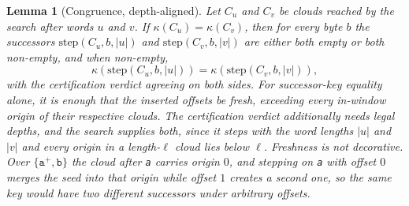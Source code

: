 \documentclass[11pt,a4paper]{article}
\theoremstyle{definition}
\theoremstyle{plain}
\newtheorem{lemma}{Lemma}
\newcommand{\code}[1]{\texttt{#1}}
\begin{document}
\begin{lemma}[Congruence, depth-aligned] \label{lem:congruence} Let $C_u$ and $C_v$ be clouds reached by the search
after words $u$ and $v$. If $\kappa(C_u) = \kappa(C_v)$, then for every byte $b$ the successors
$\mathrm{step}(C_u, b, |u|)$ and $\mathrm{step}(C_v, b, |v|)$ are either both empty or both non-empty, and when
non-empty, \[ \kappa(\mathrm{step}(C_u, b, |u|)) = \kappa(\mathrm{step}(C_v, b, |v|)), \] with the certification verdict
agreeing on both sides. For successor-key equality alone, it is enough that the inserted offsets be \emph{fresh},
exceeding every in-window origin of their respective clouds. The certification verdict additionally needs legal depths,
and the search supplies both, since it steps with the word lengths $|u|$ and $|v|$ and every origin in a length-$\ell$
cloud lies below $\ell$. Freshness is not decorative. Over $\{\code{a}^+, \code{b}\}$ the cloud after \code{a} carries
origin $0$, and stepping on \code{a} with offset $0$ merges the seed into that origin while offset $1$ creates a second
one, so the same key would have two different successors under arbitrary offsets. \end{lemma}
\end{document}
